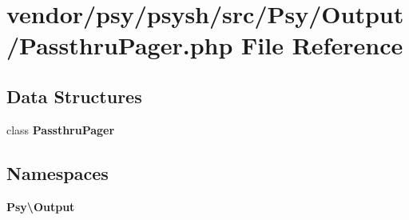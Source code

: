 \section{vendor/psy/psysh/src/\+Psy/\+Output/\+Passthru\+Pager.php File Reference}
\label{_passthru_pager_8php}
\subsection*{Data Structures}
\begin{DoxyCompactItemize}
\item 
class {\bf Passthru\+Pager}
\end{DoxyCompactItemize}
\subsection*{Namespaces}
\begin{DoxyCompactItemize}
\item 
 {\bf Psy\textbackslash{}\+Output}
\end{DoxyCompactItemize}
